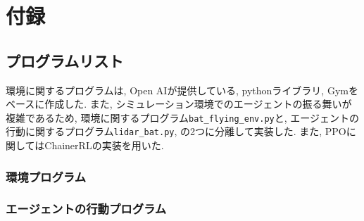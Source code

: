 \documentclass[../main]{subfiles}
\begin{document}
\lstset{language=Python, basicstyle=\ttfamily}

\newpage

\chapter*{付録}


\section*{プログラムリスト}
環境に関するプログラムは, Open AIが提供している, 
pythonライブラリ, Gymをベースに作成した.
また, シミュレーション環境でのエージェントの振る舞いが 
複雑であるため, 
環境に関するプログラム\verb|bat_flying_env.py|と, 
エージェントの行動に関するプログラム\verb|lidar_bat.py|, 
の2つに分離して実装した.
また, PPOに関してはChainerRLの実装を用いた.

\subsection*{環境プログラム}



\newpage
\subsection*{エージェントの行動プログラム}

\end{document}
